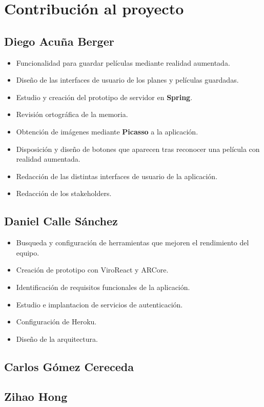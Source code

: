 
\cleardoublepage


\chapter{Contribución al proyecto}
\label{makereference7}

\section{Diego Acuña Berger}
\label{makereference7.1}
\begin{itemize}
    \item Funcionalidad para guardar películas mediante realidad aumentada.
    \item Diseño de las interfaces de usuario de los planes y películas guardadas.  
    \item Estudio y creación del prototipo de servidor en \textbf{Spring}.
    \item Revisión ortográfica de la memoria.
    \item Obtención de imágenes mediante \textbf{Picasso} a la aplicación.
    \item Disposición y diseño de botones que aparecen tras reconocer una película con realidad aumentada.
    \item Redacción de las distintas interfaces de usuario de la aplicación.
    \item Redacción de los stakeholders.
\end{itemize}
\section{Daniel Calle Sánchez}
\label{makereference7.2}
\begin{itemize}  
    \item Busqueda y configuración de herramientas que mejoren el rendimiento del equipo.
    \item Creación de prototipo con ViroReact y ARCore.
    \item Identificación de requisitos funcionales de la aplicación.
    \item Estudio e implantacion de servicios de autenticación.
    \item Configuración de Heroku.
    \item Diseño de la arquitectura.
\end{itemize}

\section{Carlos Gómez Cereceda}
\label{makereference7.3}

\section{Zihao Hong}
\label{makereference7.4}